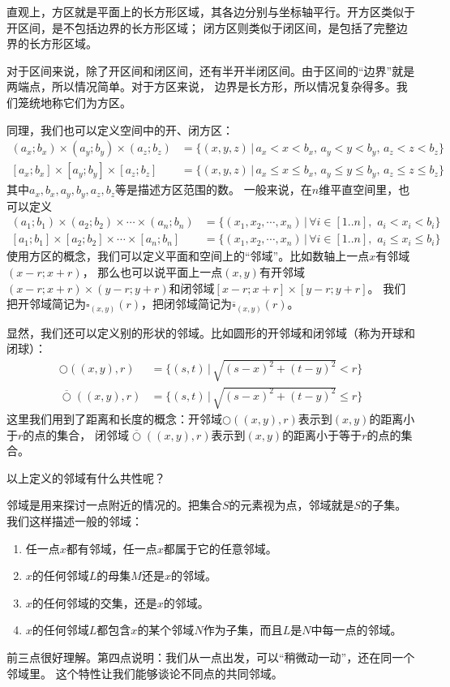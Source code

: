 \documentclass[12pt,UTF8]{ctexbook}
\theoremstyle{definition}
\theoremstyle{plain}
\begin{document}
直观上，方区就是平面上的长方形区域，其各边分别与坐标轴平行。开方区类似于开区间，是不包括边界的长方形区域；
闭方区则类似于闭区间，是包括了完整边界的长方形区域。

对于区间来说，除了开区间和闭区间，还有半开半闭区间。由于区间的“边界”就是两端点，所以情况简单。对于方区来说，
边界是长方形，所以情况复杂得多。我们笼统地称它们为方区。

同理，我们也可以定义空间中的开、闭方区：
\begin{align*}
    (a_x;b_x)\times(a_y;b_y)\times(a_z;b_z) &= \{(x, y, z) \, | \, a_x < x < b_x,\, a_y < y < b_y,\, a_z < z < b_z\} \\
    [a_x;b_x]\times[a_y;b_y]\times[a_z;b_z]\; &= \{(x, y, z) \, | \, a_x \leqslant  x \leqslant b_x,\, a_y \leqslant y \leqslant b_y,\, a_z \leqslant z \leqslant b_z\}
\end{align*}
其中$a_x, b_x, a_y, b_y, a_z, b_z$等是描述方区范围的数。
一般来说，在$n$维平直空间里，也可以定义
\begin{align*}
    (a_1;b_1)\times(a_2;b_2)\times\cdots\times(a_n;b_n) &= \{(x_1, x_2, \cdots, x_n) \, | \, \forall i\in[1..n],\,\, a_i < x_i < b_i\} \\
    [a_1;b_1]\times[a_2;b_2]\times\cdots\times[a_n;b_n]\; &= \{(x_1, x_2, \cdots, x_n) \, | \, \forall i\in[1..n],\,\, a_i \leqslant x_i \leqslant b_i\} 
\end{align*}
使用方区的概念，我们可以定义平面和空间上的“邻域”。比如数轴上一点$x$有邻域$(x-r;x+r)$，
那么也可以说平面上一点$(x, y)$有开邻域$(x-r;x+r)\times(y-r;y+r)$和闭邻域$[x-r;x+r]\times[y-r;y+r]$。
我们把开邻域简记为$\square_{(x,y)}(r)$，把闭邻域简记为$\overline{\square}_{(x,y)}(r)$。

显然，我们还可以定义别的形状的邻域。比如圆形的开邻域和闭邻域（称为开球和闭球）：
\begin{align*}
    \bigcirc((x,y),r) &= \{(s, t) \, | \, \sqrt{(s - x)^2 + (t - y)^2} < r\} \\
    \overline{\bigcirc}((x,y),r) &= \{(s, t) \, | \, \sqrt{(s - x)^2 + (t - y)^2} \leqslant r\}
\end{align*}
这里我们用到了距离和长度的概念：开邻域$\bigcirc((x,y),r)$表示到$(x, y)$的距离小于$r$的点的集合，
闭邻域$\overline{\bigcirc}((x,y),r)$表示到$(x, y)$的距离小于等于$r$的点的集合。

以上定义的邻域有什么共性呢？

邻域是用来探讨一点附近的情况的。把集合$S$的元素视为点，邻域就是$S$的子集。我们这样描述一般的邻域：
\begin{enumerate}
    \item 任一点$x$都有邻域，任一点$x$都属于它的任意邻域。
    \item $x$的任何邻域$L$的母集$M$还是$x$的邻域。
    \item $x$的任何邻域的交集，还是$x$的邻域。
    \item $x$的任何邻域$L$都包含$x$的某个邻域$N$作为子集，而且$L$是$N$中每一点的邻域。
\end{enumerate}
前三点很好理解。第四点说明：我们从一点出发，可以“稍微动一动”，还在同一个邻域里。
这个特性让我们能够谈论不同点的共同邻域。
\end{document}
